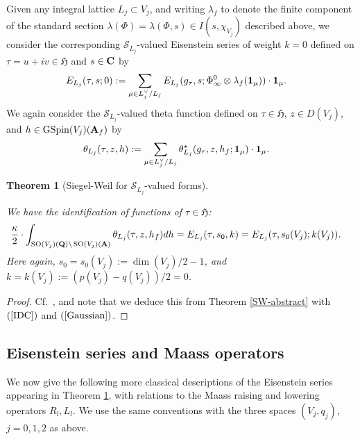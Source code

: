 \documentclass{amsart}
\newtheorem{theorem}{Theorem}[section]
\theoremstyle{definition}
\begin{document}
Given any integral lattice $L_j \subset V_j$, and writing $\lambda_f$ to denote the finite component 
of the standard section $\lambda(\Phi) = \lambda(\Phi, s) \in I(s, \chi_{V_j})$ described above, 
we consider the corresponding $\mathcal{S}_{L_j}$-valued Eisenstein series of 
weight $k = 0$ defined on $\tau = u + iv \in \mathfrak{H}$ and $s \in {\bf{C}}$ by 
\begin{align*} E_{L_j}(\tau, s; 0) &:= \sum\limits_{\mu \in L_j^{\vee}/L_j} 
E_{L_j}( g_{\tau}  , s; \Phi_{\infty}^0 \otimes \lambda_f( {\bf{1}}_{\mu } )) \cdot {\bf{1}}_{\mu}. \end{align*} 
We again consider the $\mathcal{S}_{L_j}$-valued theta function defined on 
$\tau \in \mathfrak{H}$, $z \in D(V_j)$, and $h \in \operatorname{GSpin}(V_j)({\bf{A}}_f)$ by  
\begin{align*}\theta_{L_j}(\tau, z, h) 
&:= \sum\limits_{\mu \in L_j^{\vee}/ L_j} \theta_{L_j}^{\star}(g_{\tau}, z, h_f; {\bf{1}}_{\mu}) \cdot {\bf{1}}_{\mu}. \end{align*}

\begin{theorem}[Siegel-Weil for $\mathcal{S}_{L_j}$-valued forms]\label{SW-vector} 

We have the identification of functions of $\tau \in \mathfrak{H}$:
\begin{align*} \frac{\kappa}{2} \cdot \int_{ \operatorname{SO}(V_j)({\bf{Q}}) \backslash \operatorname{SO}(V_j)({\bf{A}})}
\theta_{L_j}(\tau, z, h_f) dh &= E_{L_j}(\tau, s_0, k) = E_{L_j}(\tau, s_0(V_j); k(V_j)). \end{align*}
Here again, $s_0 = s_0(V_j) := \dim(V_j)/2 -1$, and $k = k(V_j) := (p(V_j) - q(V_j))/2 = 0$. \end{theorem}

\begin{proof} Cf.~\cite[Proposition 2.2]{BY}, and note that we deduce this from Theorem \ref{SW-abstract} with $(\ref{IDC})$ and $(\ref{Gaussian})$. \end{proof}

\subsection{Eisenstein series and Maass operators}

We now give the following more classical descriptions of the Eisenstein series appearing in Theorem \ref{SW-vector}, 
with relations to the Maass raising and lowering operators $R_l, L_l$. We use the same conventions with the three spaces $(V_j, q_j)$, $j=0,1,2$ as above.
\end{document}
